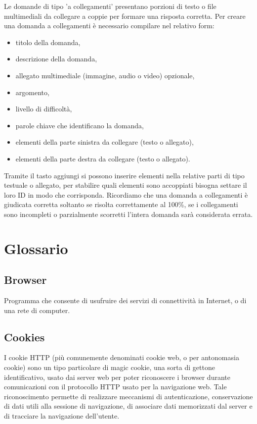 \documentclass[a4paper, titlepage]{article}
\begin{document}
	 Le domande di tipo 'a collegamenti' presentano porzioni di testo o file multimediali da collegare a coppie per formare una risposta corretta.
	 Per creare una domanda a collegamenti è necessario compilare nel relativo form:
	 \begin{itemize}
	 	\item titolo della domanda,
	 	\item descrizione della domanda,
	 	\item allegato multimediale (immagine, audio o video) opzionale,
	 	\item argomento,
	 	\item livello di difficoltà,
	 	\item parole chiave che identificano la domanda,
	 	\item elementi della parte sinistra da collegare (testo o allegato),
	 	\item elementi della parte destra da collegare (testo o allegato).
	 \end{itemize}
	 Tramite il tasto aggiungi si possono inserire elementi nella relative parti di tipo testuale o allegato, per stabilire quali elementi sono accoppiati bisogna settare il loro ID in modo che corrisponda. Ricordiamo che una domanda a collegamenti è giudicata corretta soltanto se risolta correttamente al 100\%, se i collegamenti sono incompleti o parzialmente scorretti l'intera domanda sarà considerata errata.
	 
	 \section{Glossario}
	 \label{gl} 
	 
	 \subsection{Browser}
	 Programma che consente di usufruire dei servizi di connettività in Internet, o di una rete di computer.
	 
	 \subsection{Cookies}
	 I cookie HTTP (più comunemente denominati cookie web, o per antonomasia cookie) sono un tipo
	 particolare di magic cookie, una sorta di gettone identificativo, usato dai server web per poter
	 riconoscere i browser durante comunicazioni con il protocollo HTTP usato per la navigazione web.
	 Tale riconoscimento permette di realizzare meccanismi di autenticazione, conservazione di dati utili
	 alla sessione di navigazione, di associare dati memorizzati dal server e di tracciare la navigazione dell’utente.
	 
\end{document}
